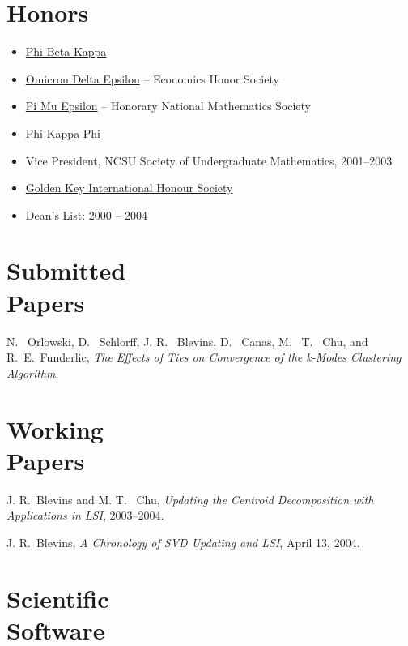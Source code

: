 \documentclass[margin,line,11pt,draft]{res}
\begin{document}
\begin{resume}
\section{\sc Honors}
\begin{itemize}
\item \href{http://www.pbk.org/}{Phi Beta Kappa}
\item \href{http://www.cba.ua.edu/~ode/}
  {Omicron Delta Epsilon} -- Economics Honor Society
\item \href{http://www.pme-math.org/}
  {Pi Mu Epsilon} -- Honorary National Mathematics Society
\item \href{http://www.phikappaphi.org/}{Phi Kappa Phi}
\item Vice President, NCSU Society of Undergraduate Mathematics, 2001--2003
\item \href{www.goldenkey.org}{Golden Key International Honour Society}
\item Dean's List: 2000 -- 2004
\end{itemize}


\section{\sc Submitted \\Papers}

N. \ Orlowski, D. \ Schlorff, J. R. \ Blevins, D. \ Canas, M. \ T. \ Chu,
and R.\ E.\ Funderlic, {\em The Effects of Ties on Convergence of the
k-Modes Clustering Algorithm}.  %


\section{\sc Working \\Papers}

J. R.\ Blevins and M. T. \ Chu, {\em Updating the Centroid
Decomposition with Applications in LSI}, 2003--2004.

J. R.\ Blevins, {\em A Chronology of SVD Updating and LSI}, April 13, 2004.


\section{\sc Scientific \\Software}


\end{resume}
\end{document}
